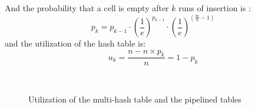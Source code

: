 And the probability that a cell is empty after $k$ runs of insertion is :
\begin{equation}\label{equation4}
p_k = p_{k-1}\cdot (\frac{1}{e})^{p_{k-1}}\cdot(\frac{1}{e})^{(\frac{m}{n} - 1)}
\end{equation}
and the utilization of the hash table is:
\begin{equation}\label{equation5}
u_k = \frac{n - n\times p_k}{n} = 1 - p_k
\end{equation}
\fi



\begin{figure}[t]
    \centering
    \mbox{
    }
    \caption{Utilization of the multi-hash table and the pipelined tables}
    \label{fig:pipelinedtablesutilizationratio}
\end{figure}

